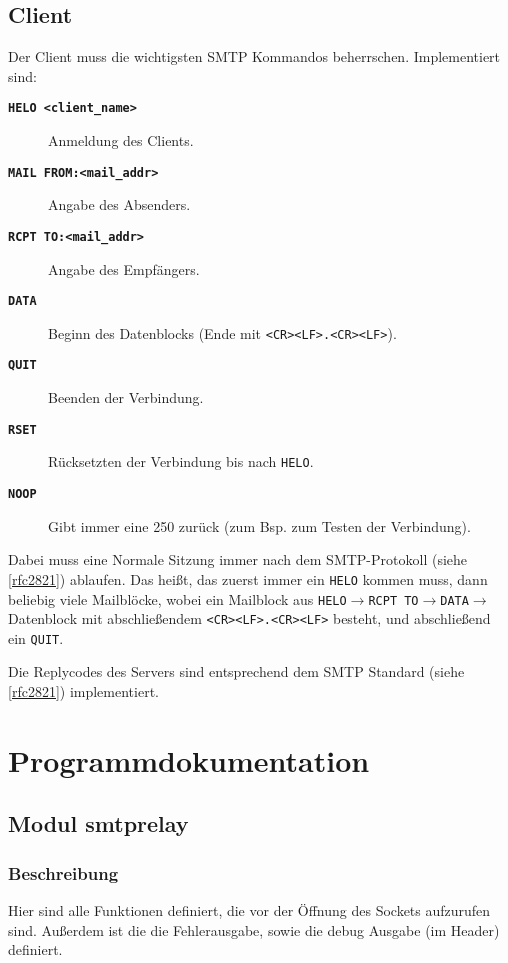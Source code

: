 \documentclass[pdftex,final,a4paper,10pt,notitlepage,halfparskip]{scrreprt}
\begin{document}
\section{Client}
Der Client muss die wichtigsten SMTP Kommandos beherrschen. Implementiert sind:
\begin{description}
  \item[\texttt\bfseries{HELO <client\_name>}] Anmeldung des Clients.
  \item[\texttt\bfseries{MAIL FROM:<mail\_addr>}] Angabe des Absenders.
  \item[\texttt\bfseries{RCPT TO:<mail\_addr>}] Angabe des Empfängers.
  \item[\texttt\bfseries{DATA}] Beginn des Datenblocks (Ende mit \texttt{<CR><LF>.<CR><LF>}).
  \item[\texttt\bfseries{QUIT}] Beenden der Verbindung.
  \item[\texttt\bfseries{RSET}] Rücksetzten der Verbindung bis nach \texttt{HELO}. 
  \item[\texttt\bfseries{NOOP}] Gibt immer eine 250 zurück (zum Bsp. zum Testen der Verbindung).
\end{description}

Dabei muss eine Normale Sitzung immer nach dem SMTP-Protokoll (siehe \ref{rfc2821}) ablaufen. Das heißt, das zuerst immer ein \texttt{HELO} kommen muss, dann beliebig viele Mailblöcke, wobei ein Mailblock aus \texttt{HELO}$\rightarrow$\texttt{RCPT TO}$\rightarrow$\texttt{DATA}$\rightarrow$Datenblock mit abschließendem \texttt{<CR><LF>.<CR><LF>} besteht, und abschließend ein \texttt{QUIT}.

Die Replycodes des Servers sind entsprechend dem SMTP Standard (siehe \ref{rfc2821}) implementiert.

\chapter{Programmdokumentation}
\section{Modul smtprelay}\label{mod:smtprelay}
\subsection{Beschreibung}
Hier sind alle Funktionen definiert, die vor der Öffnung des Sockets aufzurufen sind. Außerdem ist die die Fehlerausgabe, sowie die debug Ausgabe (im Header) definiert. 
\end{document}
